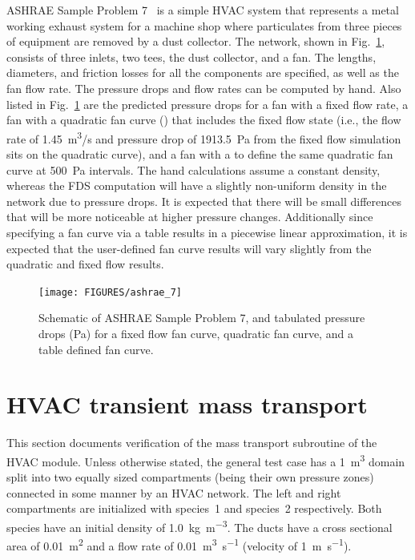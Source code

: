 \documentclass[11pt]{book}
\begin{document}
ASHRAE Sample Problem 7~\cite{ASHRAE} is a simple HVAC system that represents a metal working exhaust system for a machine shop where particulates from three pieces of equipment are removed by a dust collector.  The network, shown in Fig.~\ref{ASHRAE7}, consists of three inlets, two tees, the dust collector, and a fan.  The lengths, diameters, and friction losses for all the components are specified, as well as the fan flow rate. The pressure drops and flow rates can be computed by hand.  Also listed in Fig.~\ref{ASHRAE7} are the predicted pressure drops for a fan with a fixed flow rate, a fan with a quadratic fan curve () that includes the fixed flow state (i.e., the flow rate of 1.45~\si{m^3/s} and pressure drop of 1913.5~Pa from the fixed flow simulation sits on the quadratic curve), and a fan with a  to define the same quadratic fan curve at 500~Pa intervals. The hand calculations assume a constant density, whereas the FDS computation will have a slightly non-uniform density in the network due to pressure drops. It is expected that there will be small differences that will be more noticeable at higher pressure changes.  Additionally since specifying a fan curve via a table results in a piecewise linear approximation, it is expected that the user-defined fan curve results will vary slightly from the quadratic and fixed flow results.


\begin{figure}[ht]
\centering
\texttt{[image: FIGURES/ashrae\_7]}
\caption[Results of  test cases]{Schematic of ASHRAE Sample Problem 7, and tabulated pressure drops (Pa) for a fixed flow fan curve, quadratic fan curve, and a table defined fan curve.}
\label{ASHRAE7}
\end{figure}

\section{HVAC transient mass transport}
This section documents verification of the mass transport subroutine of the HVAC module. Unless otherwise stated, the general test case has a \SI{1}{\meter\cubed} domain split into two equally sized compartments (being their own pressure zones) connected in some manner by an HVAC network. The left and right compartments are initialized with species~1 and species~2 respectively. Both species have an initial density of \SI[per-mode=symbol]{1.0}{\kilogram\per\meter\cubed}. The ducts have a cross sectional area of \SI{0.01}{m^2} and a flow rate of \SI[per-mode=symbol]{0.01}{\meter\cubed\per\second} (velocity of \SI[per-mode=symbol]{1}{\meter\per\second}).
\end{document}
